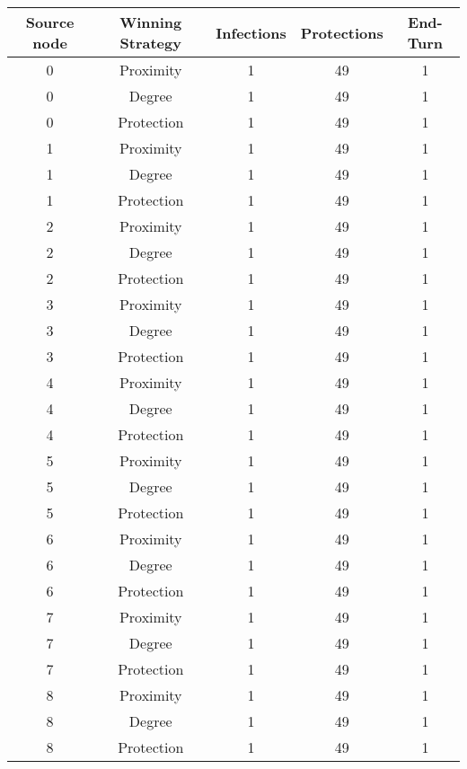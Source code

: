 \documentclass[results.tex]{subfiles}
\begin{document}
\begin{center}
  \begin{tabular}{| c || c | c | c | c |}
    \hline
    {\bfseries Source node} & {\bfseries Winning Strategy} & {\bfseries Infections} & {\bfseries Protections} & {\bfseries End-Turn} \\  %
    \hline\hline
    0 & Proximity & 1 & 49 & 1 \\ 
    \hline
    0 & Degree & 1 & 49 & 1 \\ 
    \hline
    0 & Protection & 1 & 49 & 1 \\ 
    \hline
    1 & Proximity & 1 & 49 & 1 \\ 
    \hline
    1 & Degree & 1 & 49 & 1 \\ 
    \hline
    1 & Protection & 1 & 49 & 1 \\ 
    \hline
    2 & Proximity & 1 & 49 & 1 \\ 
    \hline
    2 & Degree & 1 & 49 & 1 \\ 
    \hline
    2 & Protection & 1 & 49 & 1 \\ 
    \hline
    3 & Proximity & 1 & 49 & 1 \\ 
    \hline
    3 & Degree & 1 & 49 & 1 \\ 
    \hline
    3 & Protection & 1 & 49 & 1 \\ 
    \hline
    4 & Proximity & 1 & 49 & 1 \\ 
    \hline
    4 & Degree & 1 & 49 & 1 \\ 
    \hline
    4 & Protection & 1 & 49 & 1 \\ 
    \hline
    5 & Proximity & 1 & 49 & 1 \\ 
    \hline
    5 & Degree & 1 & 49 & 1 \\ 
    \hline
    5 & Protection & 1 & 49 & 1 \\ 
    \hline
    6 & Proximity & 1 & 49 & 1 \\ 
    \hline
    6 & Degree & 1 & 49 & 1 \\ 
    \hline
    6 & Protection & 1 & 49 & 1 \\ 
    \hline
    7 & Proximity & 1 & 49 & 1 \\ 
    \hline
    7 & Degree & 1 & 49 & 1 \\ 
    \hline
    7 & Protection & 1 & 49 & 1 \\ 
    \hline
    8 & Proximity & 1 & 49 & 1 \\ 
    \hline
    8 & Degree & 1 & 49 & 1 \\ 
    \hline
    8 & Protection & 1 & 49 & 1 \\ 

\end{tabular}
\end{center}
\end{document}
